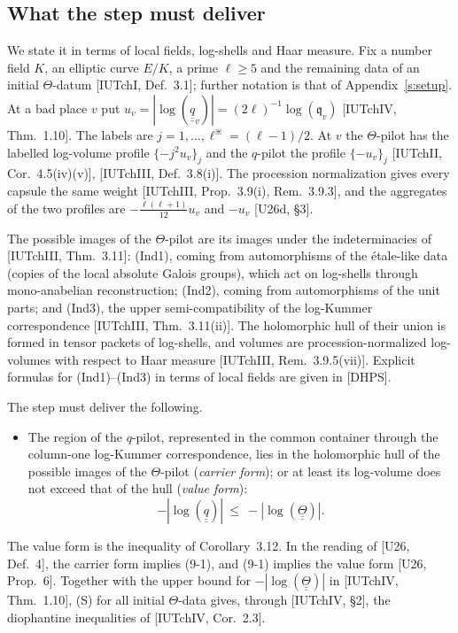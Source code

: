 \documentclass[11pt]{article}
\newcommand{\uu}[1]{\underline{\underline{#1}}}
\theoremstyle{definition}
\begin{document}
\subsection{What the step must deliver}\label{ss:target}

We state it in terms of local fields, log-shells and Haar measure.
Fix a number field $K$, an elliptic curve $E/K$, a prime $\ell\ge5$
and the remaining data of an initial $\Theta$-datum
[IUTchI, Def.~3.1]; further notation is that of
Appendix~\ref{s:setup}.  At a bad place $v$ put
$u_v=|\log(\uu q_v)|=(2\ell)^{-1}\log(\mathfrak q_v)$
[IUTchIV, Thm.~1.10].  The labels are
$j=1,\ldots,\ell^\divideontimes=(\ell-1)/2$.  At $v$ the
$\Theta$-pilot has the labelled log-volume profile
$\{-j^2u_v\}_j$ and the $q$-pilot the profile $\{-u_v\}_j$
[IUTchII, Cor.~4.5(iv)(v)], [IUTchIII, Def.~3.8(i)].  The procession
normalization gives every capsule the same weight
[IUTchIII, Prop.~3.9(i), Rem.~3.9.3], and the aggregates of the two
profiles are $-\frac{\ell(\ell+1)}{12}u_v$ and $-u_v$
[U26d, \S3].

The possible images of the $\Theta$-pilot are its images under the
indeterminacies of [IUTchIII, Thm.~3.11]: (Ind1), coming from
automorphisms of the \'etale-like data (copies of the local absolute
Galois groups), which act on log-shells through mono-anabelian
reconstruction; (Ind2), coming from automorphisms of the unit parts;
and (Ind3), the upper semi-compatibility of the log-Kummer
correspondence [IUTchIII, Thm.~3.11(ii)].  The holomorphic hull of
their union is formed in tensor packets of log-shells, and volumes
are procession-normalized log-volumes with respect to Haar measure
[IUTchIII, Rem.~3.9.5(vii)].  Explicit formulas for (Ind1)--(Ind3)
in terms of local fields are given in [DHPS].

The step must deliver the following.
\begin{itemize}[leftmargin=2.6em,labelwidth=2em,labelsep=0.6em,align=left]
\item[(S)] The region of the $q$-pilot, represented in the common
container through the column-one log-Kummer correspondence, lies in
the holomorphic hull of the possible images of the $\Theta$-pilot
(\emph{carrier form}); or at least its log-volume does not exceed
that of the hull (\emph{value form}):
\[
-|\log(\uu q)|\ \le\ -|\log(\uu\Theta)|.
\]
\end{itemize}
The value form is the inequality of Corollary~3.12.  In the reading
of [U26, Def.~4], the carrier form implies (9-1), and (9-1) implies
the value form [U26, Prop.~6].  Together with the upper bound for
$-|\log(\uu\Theta)|$ in [IUTchIV, Thm.~1.10], (S) for all initial
$\Theta$-data gives, through [IUTchIV, \S2], the diophantine
inequalities of [IUTchIV, Cor.~2.3].
\end{document}
